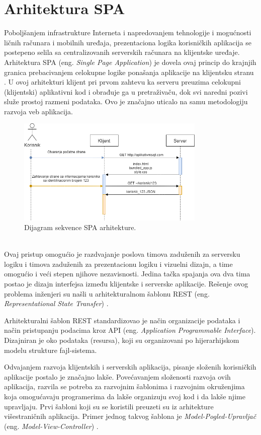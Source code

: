 \documentclass[12pt,oneside]{memoir}
\begin{document}
\chapter{Arhitektura SPA}\label{chap:SPA}
Poboljšanjem infrastrukture Interneta i napredovanjem tehnologije i mogućnosti
ličnih računara
i mobilnih uređaja, prezentaciona logika korisničkih aplikacija se postepeno
selila sa centralizovanih
serverskih računara na klijentske uređaje. Arhitektura SPA (eng. \emph{Single Page Application}) je dovela ovaj princip
do krajnjih granica
prebacivanjem celokupne logike ponašanja aplikacije na klijentsku stranu \cite{SPA}. U ovoj arhitekturi klijent
pri prvom zahtevu
ka serveru preuzima celokupni (klijentski) aplikativni kod i obrađuje ga u
pretraživaču, dok
svi naredni pozivi služe prostoj razmeni podataka. Ovo je značajno uticalo
na samu metodologiju razvoja veb aplikacija.
\begin{figure}[!ht]
  \centering
  \includegraphics[width=0.8\textwidth]{slike/SPA_Diagram (3).png}
  \caption{Dijagram sekvence SPA arhitekture.}
  \label{fig:SPA}
\end{figure}\\
Ovaj pristup omogućio je razdvajanje poslova timova zaduženih za
serversku logiku i timova zaduženih za prezentacionu logiku i vizuelni dizajn,
a time omogućio i veći stepen njihove nezavisnosti.
Jedina tačka spajanja ova dva tima postao je dizajn interfejsa
između klijentske i serverske aplikacije. Rešenje ovog problema inženjeri su našli
u arhitekturalnom šablonu REST (eng. \emph{Representational State Transfer}) \cite{REST}.

Arhitekturalni šablon REST standardizovao je način organizacije podataka
i način pristupanju podacima kroz API (eng. \emph{Application Programmable Interface}). 
Dizajniran je oko podataka (resursa), koji su organizovani po hijerarhijskom modelu
strukture fajl-sistema.

Odvajanjem razvoja klijentskih i serverskih aplikacija, pisanje složenih korisničkih aplikacije postalo je značajno lakše.
Povećavanjem složenosti razvoja ovih aplikacija,
razvila se potreba za razvojnim šablonima i razvojnim okruženjima koja omogućavaju
programerima da lakše organizuju svoj kod i da lakše njime upravljaju.
Prvi šabloni koji su se koristili preuzeti su iz arhitekture višestraničnih aplikacija.
Primer jednog takvog šablona je \emph{Model-Pogled-Upravljač} (eng. \emph{Model-View-Controller}) \cite{MVC}. 
\end{document}
